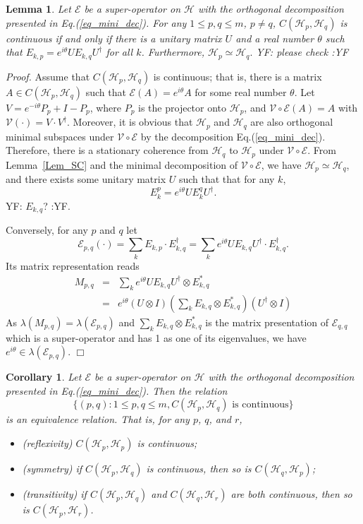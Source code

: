 \documentclass[journal]{IEEEtran}
\def\h{\ensuremath{\mathcal{H}}}
\def\v{\ensuremath{\mathcal{V}}}
\def\e{\ensuremath{\mathcal{E}}}
\newtheorem{corollary}{Corollary}
\newtheorem{lemma}{Lemma}
\newcommand{\authorComment}[3]{\color{#1}#2: {#3} :#2\color{black}}
\newcommand{\yf}[1]{\authorComment{blue}{YF}{#1}}
\begin{document}
\begin{lemma}\label{lem_block_eq}
  Let $\e$ be a super-operator on $\h$ with the orthogonal decomposition presented in Eq.(\ref{eq_mini_dec}). For any $1\leq p, q\leq m$, $p\neq q$, $C(\h_p,\h_q)$ is continuous if and only if there is a unitary matrix $U$ and a real number $\theta$ such that 
  $E_{k,p}=e^{i\theta}UE_{k,q}U^\dagger$ for all $k$.
  Furthermore, $\h_p\simeq\h_q.$ \yf{please check}
\end{lemma}
{\it Proof.} 
Assume that $C(\h_p,\h_q)$ is continuous; that is,  there is a matrix $A\in C(\h_p,\h_q)$ such that $\e(A)=e^{i\theta}A$ for some real number $\theta$. Let $V=e^{-i\theta}P_p+I-P_p$, where $P_p$ is the projector onto $\h_p$,  and  $\v\circ\e(A)=A$ with $\v(\cdot)=V\cdot V^\dagger$. Moreover, it is obvious that $\h_p$ and $\h_q$ are also orthogonal minimal subspaces under $\v\circ\e$  by the decomposition Eq.(\ref{eq_mini_dec}). Therefore, there is a stationary coherence from $\h_q$ to $\h_p$ under $\v\circ\e.$ From Lemma~\ref{Lem_SC} and the minimal decomposition of $\v\circ\e$, we have $\h_p\simeq\h_q$, and there exists some unitary matrix $U$ such that that for any $k$,
$$E_k^p=e^{i\theta }UE_k^qU^\dagger.$$ \yf{$E_{k,q}$?}.

Conversely, for any $p$ and $q$ let $$\e_{p,q}(\cdot)=\sum_{k}E_{k,p}\cdot E_{k,q}^\dagger=\sum_{k}e^{i\theta}UE_{k,q}U^\dagger\cdot E_{k,q}^\dagger.$$ 
Its matrix representation \cite{guan2016decomposition} reads
\begin{eqnarray*}
  M_{p,q}&=&\sum_k e^{i\theta}UE_{k,q}U^\dagger\otimes E_{k,q}^{*}\\
  &=&e^{i\theta}(U\otimes I)\left(\sum_k E_{k,q}\otimes E_{k,q}^{*}\right)(U^\dagger\otimes I)
\end{eqnarray*}
As $\lambda(M_{p,q})=\lambda(\e_{p,q})$ and $\sum_k E_{k,q}\otimes E_{k,q}^{*}$ is the matrix presentation of $\e_{q,q}$ which is a super-operator and has 1 as one of its eigenvalues, we have $e^{i\theta}\in\lambda(\e_{p,q}).$  
\hfill $\Box$

\begin{corollary}\label{cor_cc_eq}
Let $\e$ be a super-operator on $\h$ with the orthogonal decomposition presented in Eq.(\ref{eq_mini_dec}). 
Then the relation 
$$\{(p, q) : 1\leq p, q\leq m,  C(\h_p,\h_q)  \mbox{ is continuous}\}$$
 is an equivalence relation. That is,
  for any $p$, $q$, and $r$, \begin{itemize}
    \item [(1)] (reflexivity) $C(\h_p,\h_p)$ is continuous;
    \item [(2)] (symmetry) if $C(\h_p,\h_q)$ is continuous, then so is $C(\h_q,\h_p)$;
    \item [(3)] (transitivity) if $C(\h_p,\h_q)$ and $C(\h_q,\h_r)$ are both continuous, then so is $C(\h_p,\h_r)$.
      \end{itemize}
\end{corollary}
\end{document}
